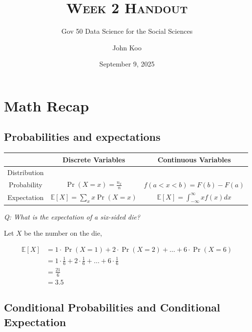\documentclass[
  11pt,
  letterpaper]{article}
\title{\textsc{Week 2 Handout}}
\subtitle{Gov 50 Data Science for the Social Sciences}
\author{John Koo}
\date{September 9, 2025}
\begin{document}
\maketitle

\section{Math Recap}\label{math-recap}

\subsection{Probabilities and
expectations}\label{probabilities-and-expectations}

\begin{table}[!h]
\centering
  \begin{tabular}{c c c}
  \toprule
   {} & Discrete Variables & Continuous Variables \\
   \midrule
  Distribution & {                } & {                } \vspace{5em}\\ 
  Probability & $\Pr(X = x) = \frac{n_x}{n}$ & $f(a < x < b)= F(b) - F(a)$\vspace{5em} \\ 
  Expectation & $\mathbb{E}[X] = \sum_x x \Pr(X = x)$ & $\mathbb{E}[X] = \int_{-\infty}^{\infty} xf(x)dx$ \vspace{5em} \\ 
  \bottomrule
  \end{tabular}
\end{table}

\emph{Q: What is the expectation of a six-sided die?}

Let \(X\) be the number on the die,

\[
\begin{aligned}
\mathbb{E}[X] &= 1 \cdot \Pr(X = 1) + 2 \cdot \Pr(X = 2) + \dots + 6 \cdot \Pr(X = 6) \\
 &= 1 \cdot \frac{1}{6} + 2 \cdot \frac{1}{6} + \dots + 6 \cdot \frac{1}{6} \\
 &= \frac{21}{6} \\
 &= 3.5
\end{aligned}
\]

\newpage

\subsection{Conditional Probabilities and Conditional
Expectation}\label{conditional-probabilities-and-conditional-expectation}
\end{document}
